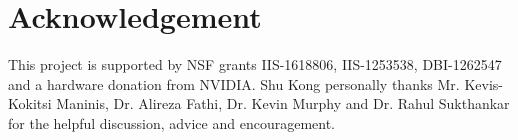 \section*{Acknowledgement}
This project is supported by NSF grants
IIS-1618806, IIS-1253538, DBI-1262547 and a hardware donation
from NVIDIA.
Shu Kong personally thanks Mr. Kevis-Kokitsi Maninis,
Dr. Alireza Fathi, Dr. Kevin Murphy and Dr. Rahul Sukthankar for the helpful discussion, advice and encouragement.
